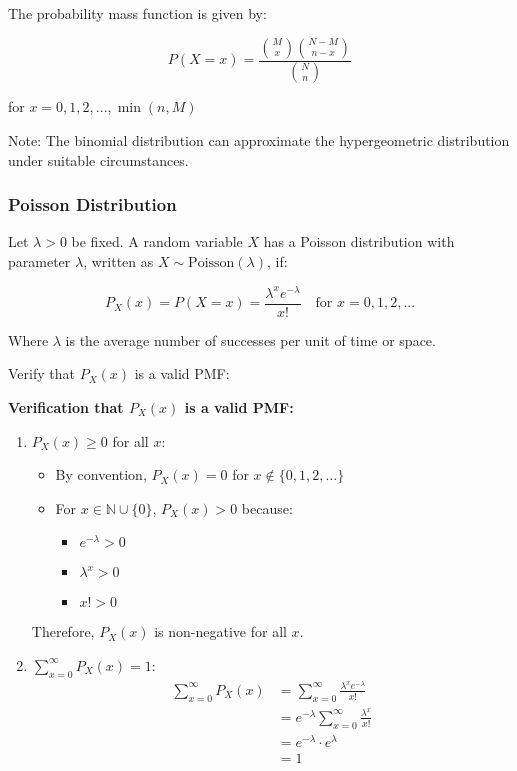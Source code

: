 \documentclass{article}
\begin{document}
    The probability mass function is given by:

    \[P(X = x) = \frac{\binom{M}{x} \binom{N-M}{n-x}}{\binom{N}{n}}\]

    for $x = 0, 1, 2, ..., \min(n, M)$

    Note: The binomial distribution can approximate the hypergeometric distribution under suitable circumstances.

    \subsubsection*{Poisson Distribution}

    Let $\lambda > 0$ be fixed. A random variable $X$ has a Poisson distribution with parameter $\lambda$, written as $X \sim \text{Poisson}(\lambda)$, if:

    \[P_X(x) = P(X = x) = \frac{\lambda^x e^{-\lambda}}{x!} \quad \text{for } x = 0, 1, 2, ...\]

    Where $\lambda$ is the average number of successes per unit of time or space.

    Verify that $P_X(x)$ is a valid PMF:

    \textbf{Verification that $P_X(x)$ is a valid PMF:}

    \begin{enumerate}
        \item $P_X(x) \geq 0$ for all $x$:
            \begin{itemize}
                \item By convention, $P_X(x) = 0$ for $x \notin \{0, 1, 2, \ldots\}$
                \item For $x \in \mathbb{N} \cup \{0\}$, $P_X(x) > 0$ because:
                    \begin{itemize}
                        \item $e^{-\lambda} > 0$
                        \item $\lambda^x > 0$
                        \item $x! > 0$
                    \end{itemize}
            \end{itemize}
            Therefore, $P_X(x)$ is non-negative for all $x$.

        \item $\sum_{x=0}^{\infty} P_X(x) = 1$:
            \begin{align*}
                \sum_{x=0}^{\infty} P_X(x) &= \sum_{x=0}^{\infty} \frac{\lambda^x e^{-\lambda}}{x!} \\
                &= e^{-\lambda} \sum_{x=0}^{\infty} \frac{\lambda^x}{x!} \\
                &= e^{-\lambda} \cdot e^{\lambda} \\
                &= 1
            \end{align*}
    \end{enumerate}
\end{document}
